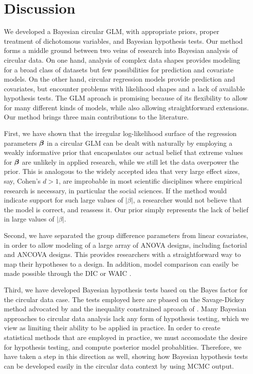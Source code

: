 \section{Discussion}

\label{discussion}


We developed a Bayesian circular GLM, with appropriate priors, proper treatment of dichotomous variables, and Bayesian hypothesis tests. Our method forms a middle ground between two veins of research into Bayesian analysis of circular data. On one hand, analysis of complex data shapes \citep{ghosh2003semiparametric, ferreira2008directional, fernandez2016bayesian} provides modeling for a broad class of datasets but few possibilities for prediction and covariate models. On the other hand, circular regression models \citep{fisher1992regression, gill2010, lagona2016regression} provide prediction and covariates, but encounter problems with likelihood shapes and a lack of available hypothesis tests. The GLM aproach is promising because of its flexibility to allow for many different kinds of models, while also allowing straightforward extensions. Our method brings three main contributions to the literature.

First, we have shown that the irregular log-likelihood surface of the regression parameters \( \boldsymbol{\beta} \) in a circular GLM can be dealt with naturally by employing a weakly informative prior that encapsulates our actual belief that extreme values for \( \boldsymbol{\beta} \) are unlikely in applied research, while we still let the data overpower the prior. This is analogous to the widely accepted idea that very large effect sizes, say, Cohen's \( d > 1 \), are improbable in most scientific disciplines where empirical research is necessary, in particular the social sciences. If the method would indicate support for such large values of \( \vert \beta \vert \), a researcher would not believe that the model is correct, and reassess it. Our prior simply represents the lack of belief in large values of \( \vert \beta \vert.\)

Second, we have separated the group difference parameters from linear covariates, in order to allow modeling of a large array of ANOVA designs, including factorial and ANCOVA designs. This provides researchers with a straightforward way to map their hypotheses to a design. In addition, model comparison can easily be made possible through the DIC or WAIC \citep[Ch. 7]{gelman2003bayesian}.

Third, we have developed Bayesian hypothesis tests based on the Bayes factor for the circular data case. The tests employed here are pbased on the Savage-Dickey method advocated by \citet{wagenmakers2010sdd} and the inequality constrained aproach of \citet{hoijtink2011informative}. Many Bayesian approaches to circular data analysis lack any form of hypothesis testing, which we view as limiting their ability to be applied in practice. In order to create statistical methods that are employed in practice, we must accomodate the desire for hypothesis testing, and compute posterior model probablities. Therefore, we have taken a step in this direction as well, showing how Bayesian hypothesis tests can be developed easily in the circular data context by using MCMC output.

